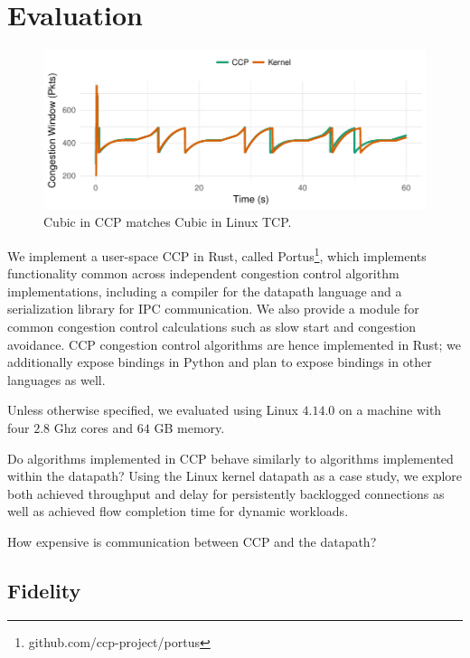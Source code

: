 \section{Evaluation}
\label{sec:eval}
\begin{figure}[t]
\centering
    \includegraphics[width=\columnwidth]{img/cubic-3-cwnd-evo-new}
    \caption{Cubic in CCP matches Cubic in Linux TCP.}\label{fig:eval:fidelity:time}
\end{figure}

We implement a user-space CCP in Rust, called Portus\footnote{github.com/ccp-project/portus}, which implements functionality common across independent congestion control algorithm implementations, including a compiler for the datapath language and a serialization library for IPC communication.
We also provide a module for common congestion control calculations such as slow start and congestion avoidance.
CCP congestion control algorithms are hence implemented in Rust; we additionally expose bindings in Python and plan to expose bindings in other languages as well.

\smallskip
\noindent
Unless otherwise specified, we evaluated using Linux $4.14.0$ on a machine with four $2.8$ Ghz cores and $64$ GB memory.

 Do algorithms implemented in CCP behave similarly to algorithms implemented within the datapath? Using the Linux kernel datapath as a case study, we explore both achieved throughput and delay for persistently backlogged connections as well as achieved flow completion time for dynamic workloads.

 How expensive is communication between CCP and the datapath?

\subsection{Fidelity}
\label{sec:eval:fidelity}

